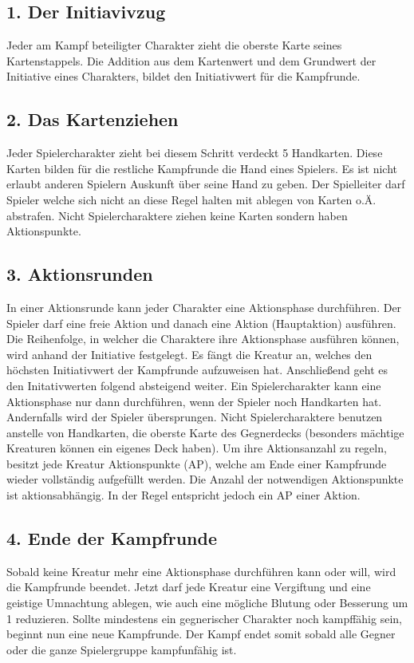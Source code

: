\subsection*{1. Der Initiavivzug}
Jeder am Kampf beteiligter Charakter zieht die oberste Karte seines Kartenstappels. Die Addition aus dem Kartenwert und dem Grundwert der Initiative eines Charakters, bildet den Initiativwert für die Kampfrunde.

\subsection*{2. Das Kartenziehen}
Jeder Spielercharakter zieht bei diesem Schritt verdeckt 5 Handkarten. Diese Karten bilden für die restliche Kampfrunde die Hand eines Spielers. Es ist nicht erlaubt anderen Spielern Auskunft über seine Hand zu geben. Der Spielleiter darf Spieler welche sich nicht an diese Regel halten mit ablegen von Karten o.Ä. abstrafen. Nicht Spielercharaktere ziehen keine Karten sondern haben Aktionspunkte.

\subsection*{3. Aktionsrunden}
In einer Aktionsrunde kann jeder Charakter eine Aktionsphase durchführen. Der Spieler darf eine freie Aktion und danach eine Aktion (Hauptaktion) ausführen. Die Reihenfolge, in welcher die Charaktere ihre Aktionsphase ausführen können, wird anhand der Initiative festgelegt. Es fängt die Kreatur an, welches den höchsten Initiativwert der Kampfrunde aufzuweisen hat. Anschließend geht es den Initativwerten folgend absteigend weiter. Ein Spielercharakter kann eine Aktionsphase nur dann durchführen, wenn der Spieler noch Handkarten hat. Andernfalls wird der Spieler übersprungen. Nicht Spielercharaktere benutzen anstelle von Handkarten, die oberste Karte des Gegnerdecks (besonders mächtige Kreaturen können ein eigenes Deck haben). Um ihre Aktionsanzahl zu regeln, besitzt jede Kreatur Aktionspunkte (AP), welche am Ende einer Kampfrunde wieder vollständig aufgefüllt werden. Die Anzahl der notwendigen Aktionspunkte ist aktionsabhängig. In der Regel entspricht jedoch ein AP einer Aktion.

\subsection*{4. Ende der Kampfrunde}
Sobald keine Kreatur mehr eine Aktionsphase durchführen kann oder will, wird die Kampfrunde beendet. Jetzt darf jede Kreatur eine Vergiftung und eine geistige Umnachtung ablegen, wie auch eine mögliche Blutung oder Besserung um 1 reduzieren. Sollte  mindestens ein gegnerischer Charakter noch kampffähig sein, beginnt nun eine neue Kampfrunde. Der Kampf endet somit sobald alle Gegner oder die ganze Spielergruppe kampfunfähig ist.


